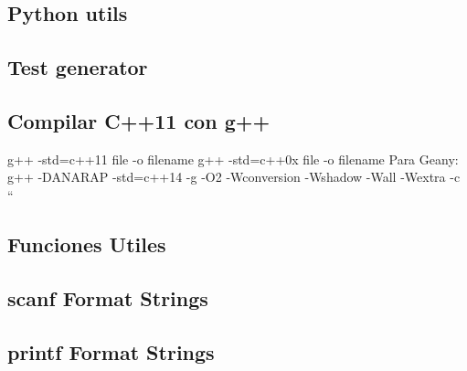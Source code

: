 \subsection{Python utils}

\subsection{Test generator}

\subsection{Compilar C++11 con g++}
\begin{code}
g++ -std=c++11 {file} -o {filename}
g++ -std=c++0x {file} -o {filename}
Para Geany: g++ -DANARAP -std=c++14 -g -O2 -Wconversion -Wshadow -Wall -Wextra -c “%
\end{code}
%
\subsection{Funciones Utiles}

\subsection{scanf Format Strings}

\subsection{printf Format Strings}

